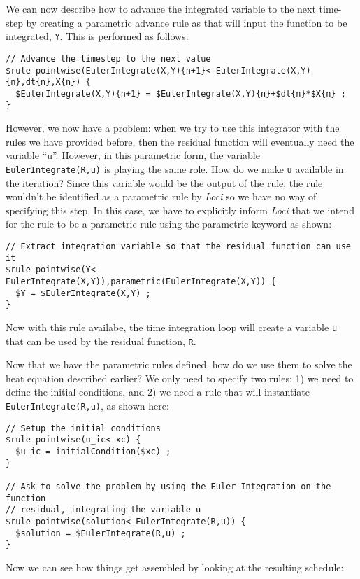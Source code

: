 \documentclass[10pt,epsf]{book}
\begin{document}
We can now describe how to advance the integrated variable to the next
time-step by creating a parametric advance rule as that will input the
function to be integrated, {\tt Y}.  This is performed as follows:
\begin{verbatim}
// Advance the timestep to the next value
$rule pointwise(EulerIntegrate(X,Y){n+1}<-EulerIntegrate(X,Y){n},dt{n},X{n}) {
  $EulerIntegrate(X,Y){n+1} = $EulerIntegrate(X,Y){n}+$dt{n}*$X{n} ;
}
\end{verbatim}

However, we now have a problem:  when we try to use this integrator
with the rules we have provided before, then the residual function
will eventually need the variable ``u''.  However, in this parametric
form, the variable {\tt EulerIntegrate(R,u)} is playing the same
role.  How do we make {\tt u} available in the iteration?  Since this
variable would be the output of the rule, the rule wouldn't be
identified as a parametric rule by {\it Loci} so we have no way of
specifying this step.  In this case, we have to explicitly inform {\it
  Loci} that we intend for the rule to be a parametric rule using the
parametric keyword as shown:
\begin{verbatim}
// Extract integration variable so that the residual function can use it
$rule pointwise(Y<-EulerIntegrate(X,Y)),parametric(EulerIntegrate(X,Y)) {
  $Y = $EulerIntegrate(X,Y) ;
}
\end{verbatim}
Now with this rule availabe, the time integration loop will create a
variable {\tt u} that can be used by the residual function, {\tt R}. 


Now that we have the parametric rules defined, how do we use them to
solve the heat equation described earlier?  We only need to specify
two rules:  1) we need to define the initial conditions, and 2) we
need a rule that will instantiate {\tt EulerIntegrate(R,u)}, as shown here:

\begin{verbatim}
// Setup the initial conditions
$rule pointwise(u_ic<-xc) {
  $u_ic = initialCondition($xc) ;
}

// Ask to solve the problem by using the Euler Integration on the function
// residual, integrating the variable u
$rule pointwise(solution<-EulerIntegrate(R,u)) {
  $solution = $EulerIntegrate(R,u) ;
}
\end{verbatim}

Now we can see how things get assembled by looking at the resulting schedule:
\end{document}
